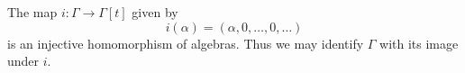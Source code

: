 The map $i: \Gamma \rightarrow \Gamma[t]$ given by
$$i(\alpha) = (\alpha, 0, \ldots, 0, \ldots)$$
is an injective homomorphism of algebras. Thus we may identify $\Gamma$ with its image under $i$.
